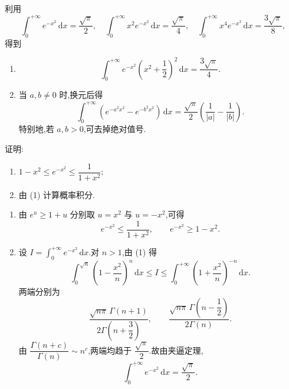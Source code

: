 \begin{solution}
  利用
  \[
    \displaystyle\int_0^{+\infty}e^{-x^2}\,\mathrm{d}x=\dfrac{\sqrt{\pi}}{2},
    \quad
    \int_0^{+\infty}x^2e^{-x^2}\,\mathrm{d}x=\dfrac{\sqrt{\pi}}{4},
    \quad
    \int_0^{+\infty}x^4e^{-x^2}\,\mathrm{d}x=\dfrac{3\sqrt{\pi}}{8},
  \]
  得到
  \begin{enumerate}
    \item
          \[
            \displaystyle\int_0^{+\infty}e^{-x^2}\left(x^2+\dfrac{1}{2}\right)^2\,\mathrm{d}x
            =\dfrac{3\sqrt{\pi}}{4}.
          \]
    \item 当 $a,b\neq0$ 时,换元后得
          \[
            \displaystyle\int_0^{+\infty}\left(e^{-a^2x^2}-e^{-b^2x^2}\right)\,\mathrm{d}x
            =\dfrac{\sqrt{\pi}}{2}\left(\dfrac{1}{|a|}-\dfrac{1}{|b|}\right).
          \]
          特别地,若 $a,b>0$,可去掉绝对值号.
  \end{enumerate}
\end{solution}

\begin{example}
  证明:
  \begin{enumerate}
    \item $1-x^2\leq e^{-x^2}\leq\dfrac{1}{1+x^2}$;
    \item 由 (1) 计算概率积分.
  \end{enumerate}
\end{example}
\exampleblank

\begin{solution}
  \leavevmode
  \begin{enumerate}
    \item 由 $e^u\geq1+u$ 分别取 $u=x^2$ 与 $u=-x^2$,可得
          \[
            e^{-x^2}\leq\dfrac{1}{1+x^2},
            \qquad
            e^{-x^2}\geq1-x^2.
          \]

    \item 设 $I=\displaystyle\int_0^{+\infty}e^{-x^2}\,\mathrm{d}x$.对 $n>1$,由 (1) 得
          \[
            \displaystyle\int_0^{\sqrt n}\left(1-\dfrac{x^2}{n}\right)^n\,\mathrm{d}x
            \leq I\leq
            \int_0^{+\infty}\left(1+\dfrac{x^2}{n}\right)^{-n}\,\mathrm{d}x.
          \]
          两端分别为
          \[
            \dfrac{\sqrt{n\pi}\,\Gamma(n+1)}{2\Gamma\left(n+\dfrac{3}{2}\right)},
            \qquad
            \dfrac{\sqrt{n\pi}\,\Gamma\left(n-\dfrac{1}{2}\right)}{2\Gamma(n)}.
          \]
          由 $\displaystyle\dfrac{\Gamma(n+c)}{\Gamma(n)}\sim n^c$,两端均趋于
          $\dfrac{\sqrt\pi}{2}$.故由夹逼定理,
          \[
            \displaystyle\int_0^{+\infty}e^{-x^2}\,\mathrm{d}x=\dfrac{\sqrt\pi}{2}.
          \]
  \end{enumerate}
\end{solution}



